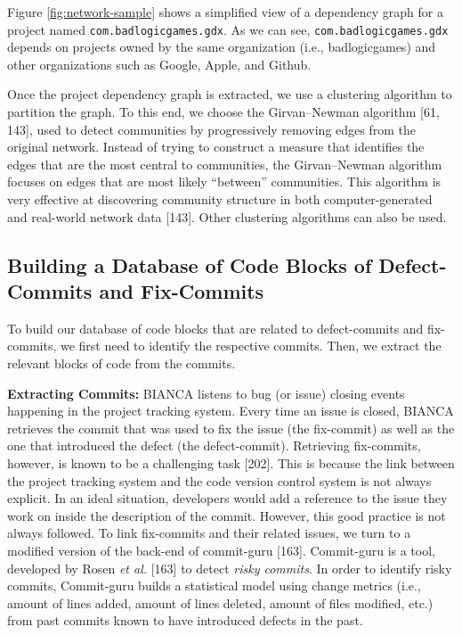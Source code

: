 \documentclass[12pt]{report}
\begin{document}
Figure \ref{fig:network-sample} shows a simplified view of a dependency
graph for a project named \texttt{com.badlogicgames.gdx}. As we can see,
\texttt{com.badlogicgames.gdx} depends on projects owned by the same
organization (i.e., badlogicgames) and other organizations such as
Google, Apple, and Github.



Once the project dependency graph is extracted, we use a clustering
algorithm to partition the graph. To this end, we choose the
Girvan--Newman algorithm {[}61, 143{]}, used to detect communities by
progressively removing edges from the original network. Instead of
trying to construct a measure that identifies the edges that are the
most central to communities, the Girvan--Newman algorithm focuses on
edges that are most likely ``between'' communities. This algorithm is
very effective at discovering community structure in both
computer-generated and real-world network data {[}143{]}. Other
clustering algorithms can also be used.

\subsection{Building a Database of Code Blocks of Defect-Commits and
Fix-Commits}\label{sec:offline}

To build our database of code blocks that are related to defect-commits
and fix-commits, we first need to identify the respective commits. Then,
we extract the relevant blocks of code from the commits.

\textbf{Extracting Commits:} BIANCA listens to bug (or issue) closing
events happening in the project tracking system. Every time an issue is
closed, BIANCA retrieves the commit that was used to fix the issue (the
fix-commit) as well as the one that introduced the defect (the
defect-commit). Retrieving fix-commits, however, is known to be a
challenging task {[}202{]}. This is because the link between the project
tracking system and the code version control system is not always
explicit. In an ideal situation, developers would add a reference to the
issue they work on inside the description of the commit. However, this
good practice is not always followed. To link fix-commits and their
related issues, we turn to a modified version of the back-end of
commit-guru {[}163{]}. Commit-guru is a tool, developed by Rosen
\emph{et al.} {[}163{]} to detect \emph{risky commits}. In order to
identify risky commits, Commit-guru builds a statistical model using
change metrics (i.e., amount of lines added, amount of lines deleted,
amount of files modified, etc.) from past commits known to have
introduced defects in the past.
\end{document}
